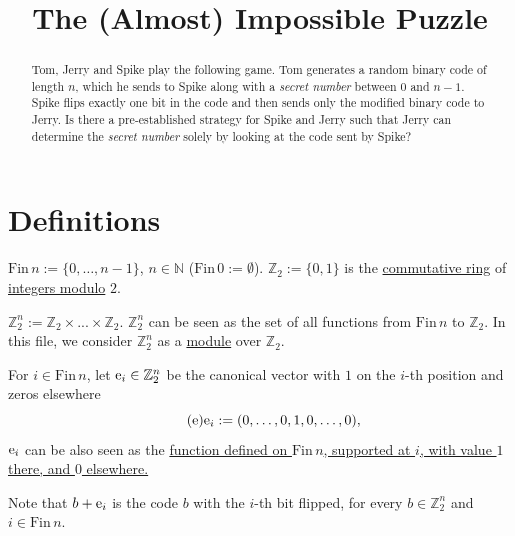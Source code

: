\documentclass[11pt]{amsart}
\title{The (Almost) Impossible Puzzle}
\newcommand{\Zz}{\mathbb{Z}_2}
\newcommand{\Fin}{\mathrm{Fin}\,}
\begin{document}
\begin{abstract}
Tom, Jerry and Spike play the following game. 
Tom generates a random binary code of length $n$, 
which he sends to Spike along with a \textit{secret number} 
between 0 and $n-1$. Spike flips exactly one bit in the code 
and then sends only the modified binary code to Jerry. 
Is there a pre-established strategy for Spike and Jerry 
such that Jerry can determine the \textit{secret number} 
solely by looking at the code sent by Spike?
\end{abstract}

\maketitle

\bigskip

\section{Definitions}

\bigskip

\begin{definition}
\href{https://leanprover-community.github.io/mathlib4_docs/Init/Prelude.html#Fin}{$\Fin$}$ n :=\{0,\ldots,n-1\}$, $n\in\mathbb{N}$ 
($\Fin 0 := \emptyset$). $\Zz := \{0,1\}$ is the \href{https://leanprover-community.github.io/mathlib4_docs/Mathlib/Algebra/Ring/Defs.html#CommRing}{commutative ring} of \href{https://leanprover-community.github.io/mathlib4_docs/Mathlib/Data/ZMod/Defs.html#ZMod}{integers modulo} $2$.
\end{definition}

\medskip

\begin{definition}
$\Zz^n := \Zz\times...\times\Zz$. $\Zz^n$ can be seen as the set of all functions from $\Fin n$ to $\Zz$. In this file, we consider $\Zz^n$ as a \href{https://leanprover-community.github.io/mathlib4_docs/Mathlib/Algebra/Module/Defs.html#Module}{module} over $\Zz$.
\end{definition}

\medskip

\begin{definition}
For $i\in \Fin n$, let ${\rm e}_i\in\Zz^n$ be the canonical vector with 
$1$ on the $i$-th position and zeros elsewhere
\begin{equation}
\tag{e}
\label{e}
{\rm e}_i := (0,\ldots,0,1,0,\ldots,0),
\end{equation}
${\rm e}_i$ can be also seen as the \href{https://leanprover-community.github.io/mathlib4_docs/Mathlib/Algebra/Notation/Pi/Basic.html#Pi.single}{function defined on $\Fin n$, 
supported at $i$, with value $1$ there, and $0$ elsewhere.}


Note that $b+{\rm e}_i$ is the code $b$ with the $i$-th bit flipped, 
for every $b\in\Zz^n$ and $i\in \Fin n$.
\end{definition}
\end{document}
